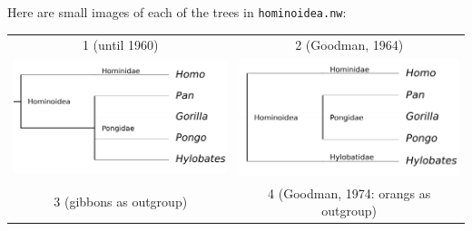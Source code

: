 \begin{samepage}
Here are small images of each of the trees in \texttt{hominoidea.nw}: \\

\begin{tabular}{cc}
1 (until 1960) & 2 (Goodman, 1964) \\
\includegraphics[scale=0.7]{homino_0.pdf} & \includegraphics[scale=0.7]{homino_1.pdf} \\
3 (gibbons as outgroup) & 4 (Goodman, 1974: orangs as outgroup) \\

\end{tabular}
\end{samepage}

